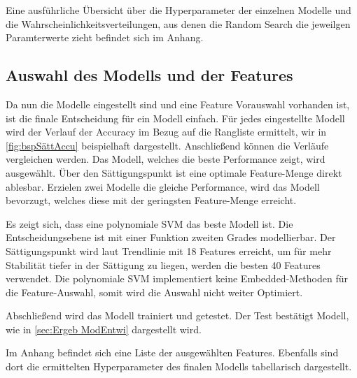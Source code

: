 Eine ausführliche Übersicht über die Hyperparameter der einzelnen Modelle und die Wahrscheinlichkeitsverteilungen, aus denen die Random Search die jeweilgen Paramterwerte zieht befindet sich im Anhang. 

\subsection{Auswahl des Modells und der Features}\label{sec:Meth ModelSele}
Da nun die Modelle eingestellt sind und eine Feature Vorauswahl vorhanden ist, ist die finale Entscheidung für ein Modell einfach. Für jedes eingestellte Modell wird der Verlauf der Accuracy im Bezug auf die Rangliste ermittelt, wir in \autoref{fig:bspSättAccu} beispielhaft dargestellt. Anschließend können die Verläufe vergleichen werden. Das Modell, welches die beste Performance zeigt, wird ausgewählt. Über den Sättigungspunkt ist eine optimale Feature-Menge direkt ablesbar. Erzielen zwei Modelle die gleiche Performance, wird das Modell bevorzugt, welches diese mit der geringsten Feature-Menge erreicht. \par

Es zeigt sich, dass eine polynomiale SVM das beste Modell ist. Die Entscheidungsebene ist mit einer Funktion zweiten Grades modellierbar. Der Sättigungspunkt wird laut Trendlinie mit 18 Features erreicht, um für mehr Stabilität tiefer in der Sättigung zu liegen, werden die besten 40 Features verwendet. Die polynomiale SVM implementiert keine Embedded-Methoden für die Feature-Auswahl, somit wird die Auswahl nicht weiter Optimiert. \par

Abschließend wird das Modell trainiert und getestet. Der Test bestätigt Modell, wie in \autoref{sec:Ergeb ModEntwi} dargestellt wird.\par

Im Anhang befindet sich eine Liste der ausgewählten Features. Ebenfalls sind dort die ermittelten Hyperparameter des finalen Modells tabellarisch dargestellt.